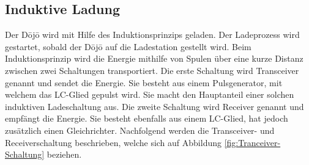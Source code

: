 \subsection{Induktive Ladung}\label{sec:energieuebertragung}

Der Dōjō wird mit Hilfe des Induktionsprinzips geladen. Der Ladeprozess wird gestartet, sobald der Dōjō auf die Ladestation gestellt wird. Beim Induktionsprinzip wird die Energie mithilfe von Spulen über eine kurze Distanz zwischen zwei Schaltungen transportiert. Die erste Schaltung wird Transceiver genannt und sendet die Energie. Sie besteht aus einem Pulsgenerator, mit welchem das LC-Glied gepulst wird. Sie macht den Hauptanteil einer solchen induktiven Ladeschaltung aus. Die zweite Schaltung wird Receiver genannt und empfängt die Energie. Sie besteht ebenfalls aus einem LC-Glied, hat jedoch zusätzlich einen Gleichrichter. Nachfolgend werden die Transceiver- und Receiverschaltung beschrieben, welche sich auf Abbildung \ref{fig:Tranceiver-Schaltung} beziehen.


